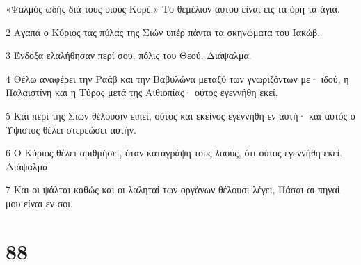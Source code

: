 \par «Ψαλμός ωδής διά τους υιούς Κορέ.» Το θεμέλιον αυτού είναι εις τα όρη τα άγια.
\par 2 Αγαπά ο Κύριος τας πύλας της Σιών υπέρ πάντα τα σκηνώματα του Ιακώβ.
\par 3 Ένδοξα ελαλήθησαν περί σου, πόλις του Θεού. Διάψαλμα.
\par 4 Θέλω αναφέρει την Ραάβ και την Βαβυλώνα μεταξύ των γνωριζόντων με· ιδού, η Παλαιστίνη και η Τύρος μετά της Αιθιοπίας· ούτος εγεννήθη εκεί.
\par 5 Και περί της Σιών θέλουσιν ειπεί, ούτος και εκείνος εγεννήθη εν αυτή· και αυτός ο Ύψιστος θέλει στερεώσει αυτήν.
\par 6 Ο Κύριος θέλει αριθμήσει, όταν καταγράψη τους λαούς, ότι ούτος εγεννήθη εκεί. Διάψαλμα.
\par 7 Και οι ψάλται καθώς και οι λαληταί των οργάνων θέλουσι λέγει, Πάσαι αι πηγαί μου είναι εν σοι.

\chapter{88}

